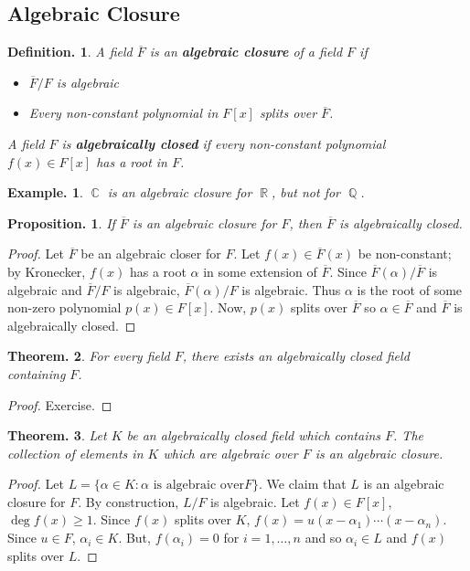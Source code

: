 \documentclass[11pt, a4paper]{memoir}
\DeclareMathOperator{\Q}{{\mathbb{Q}}}
\DeclareMathOperator{\R}{{\mathbb{R}}}
\DeclareMathOperator{\C}{{\mathbb{C}}}
\newcommand{\mbf}[1]{{\boldmath\bfseries #1}}
\theoremstyle{change}
\newtheorem{theorem}{Theorem.}[section]
\newtheorem{proposition}[theorem]{Proposition.}
\theoremstyle{plain}
\theoremstyle{nonumberplain}
\newtheorem{definition}{Definition.}
\newtheorem{example}{Example.}
\newtheorem{proof}{Proof}
\renewcommand{\textbf}[1]{{\boldmath\bfseries#1}}
\numberwithin{equation}{section}
\begin{document}
\subsection{Algebraic Closure}
\begin{definition}
    A field $\overline{F}$ is an \mbf{algebraic closure} of a field $F$ if
    \begin{itemize}[nl]
        \item $\overline{F}/F$ is algebraic
        \item Every non-constant polynomial in $F[x]$ splits over $\overline{F}$.
    \end{itemize}
    A field $F$ is \textbf{algebraically closed} if every non-constant polynomial $f(x)\in F[x]$ has a root in $F$.
\end{definition}
\begin{example}
    $\C$ is an algebraic closure for $\R$, but not for $\Q$.
\end{example}
\begin{proposition}
    If $\overline{F}$ is an algebraic closure for $F$, then $\overline{F}$ is algebraically closed.
\end{proposition}
\begin{proof}
    Let $\overline{F}$ be an algebraic closer for $F$.
    Let $f(x)\in\overline{F}(x)$ be non-constant; by Kronecker, $f(x)$ has a root $\alpha$ in some extension of $\overline{F}$.
    Since $\overline{F}(\alpha)/\overline{F}$ is algebraic and $\overline{F}/F$ is algebraic, $\overline{F}(\alpha)/F$ is algebraic.
    Thus $\alpha$ is the root of some non-zero polynomial $p(x)\in F[x]$.
    Now, $p(x)$ splits over $\overline{F}$ so $\alpha\in\overline{F}$ and $\overline{F}$ is algebraically closed.
\end{proof}
\begin{theorem}
    For every field $F$, there exists an algebraically closed field containing $F$.
\end{theorem}
\begin{proof}
    Exercise.
\end{proof}
\begin{theorem}
    Let $K$ be an algebraically closed field which contains $F$.
    The collection of elements in $K$ which are algebraic over $F$ is an algebraic closure.
\end{theorem}
\begin{proof}
    Let $L=\{\alpha\in K:\alpha\text{ is algebraic over}F\}$.
    We claim that $L$ is an algebraic closure for $F$.
    By construction, $L/F$ is algebraic.
    Let $f(x)\in F[x]$, $\deg f(x)\geq 1$.
    Since $f(x)$ splits over $K$, $f(x)=u(x-\alpha_1)\cdots(x-\alpha_n)$.
    Since $u\in F$, $\alpha_i\in K$.
    But, $f(\alpha_i)=0$ for $i=1,\ldots,n$ and so $\alpha_i\in L$ and $f(x)$ splits over $L$.
\end{proof}
\end{document}
